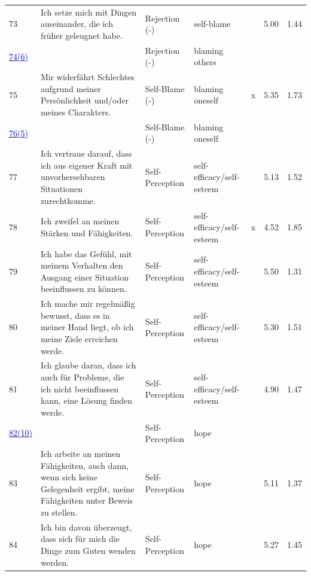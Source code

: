\documentclass[
  man,floatsintext]{apa7}
\begin{document}
\begin{center}
\begin{ThreePartTable}
{\begin{longtable}{m{0.6cm}m{7.3cm}m{2.2cm}m{2.2cm}m{0.2cm}m{0.4cm}m{0.4cm}}
73 & Ich setze mich mit Dingen auseinander, die ich früher geleugnet habe. & Rejection (-) & self-blame &  & 5.00 & 1.44\\
\label{ableh_2_081_r}\hyperref[table1]{\textcolor{blue}{74(6)}} & \cellcolor{lightgray}{Auch wenn ich jemanden zu Unrecht beschuldige, fällt es mir schwer, mich zu entschuldigen.} & Rejection (-) & blaming others & \cellcolor{lightgray}{x} & \cellcolor{lightgray}{5.29} & \cellcolor{lightgray}{1.78}\\
75 & Mir widerfährt Schlechtes aufgrund meiner Persönlichkeit und/oder meines Charakters. & Self-Blame (-) & blaming oneself & x & 5.35 & 1.73\\
\label{selbv_1_198_r}\hyperref[table1]{\textcolor{blue}{76(5)}} & \cellcolor{lightgray}{Ich spreche ungern über meine Vergangenheit, da ich mich für diese schuldig fühle.} & Self-Blame (-) & blaming oneself & \cellcolor{lightgray}{x} & \cellcolor{lightgray}{5.54} & \cellcolor{lightgray}{1.73}\\
77 & Ich vertraue darauf, dass ich aus eigener Kraft mit unvorhersehbaren Situationen zurechtkomme. & Self-Perception & self-efficacy/self-esteem &  & 5.13 & 1.52\\
78 & Ich zweifel an meinen Stärken und Fähigkeiten. & Self-Perception & self-efficacy/self-esteem & x & 4.52 & 1.85\\
79 & Ich habe das Gefühl, mit meinem Verhalten den Ausgang einer Situation beeinflussen zu können. & Self-Perception & self-efficacy/self-esteem &  & 5.50 & 1.31\\
80 & Ich mache mir regelmäßig bewusst, dass es in meiner Hand liegt, ob ich meine Ziele erreichen werde. & Self-Perception & self-efficacy/self-esteem &  & 5.30 & 1.51\\
81 & Ich glaube daran, dass ich auch für Probleme, die ich nicht beeinflussen kann, eine Lösung finden werde. & Self-Perception & self-efficacy/self-esteem &  & 4.90 & 1.47\\
\label{selbw_2_325}\hyperref[table1]{\textcolor{blue}{82(10)}} & \cellcolor{lightgray}{Auch in schwierigen Zeiten finde ich eine Lösung.} & Self-Perception & hope & \cellcolor{lightgray}{\ } & \cellcolor{lightgray}{5.26} & \cellcolor{lightgray}{1.29}\\
83 & Ich arbeite an meinen Fähigkeiten, auch dann, wenn sich keine Gelegenheit ergibt, meine Fähigkeiten unter Beweis zu stellen. & Self-Perception & hope &  & 5.11 & 1.37\\
84 & Ich bin davon überzeugt, dass sich für mich die Dinge zum Guten wenden werden. & Self-Perception & hope &  & 5.27 & 1.45\\

\end{longtable}}
\end{ThreePartTable}
\end{center}
\end{document}
